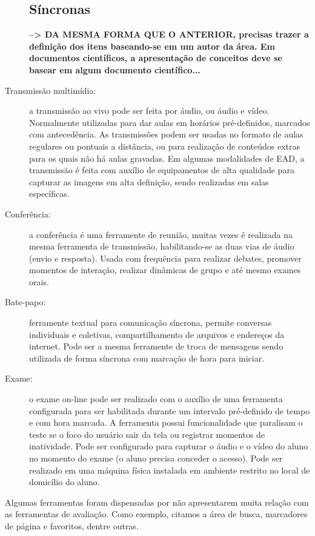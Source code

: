 \begin{description}
\subsection{Síncronas}%
\label{sub:sinc}
\textbf{--> DA MESMA FORMA QUE O ANTERIOR, precisas trazer a definição dos itens baseando-se em um autor da área. Em documentos científicos, a apresentação de conceitos deve se basear em algum documento científico...}
\item[Transmissão multimídia:] a transmissão ao vivo pode ser feita por áudio, ou áudio e vídeo. Normalmente utilizadas para dar aulas em horários pré-definidos, marcados com antecedência. As transmissões podem ser usadas no formato de aulas regulares ou pontuais a distância, ou para realização de conteúdos extras para os quais não há aulas gravadas. Em algumas modalidades de EAD, a transmissão é feita com auxílio de equipamentos de alta qualidade para capturar as imagens em alta definição, sendo realizadas em salas específicas.
\item[Conferência:] a conferência é uma ferramente de reunião, muitas vezes é realizada na mesma ferramenta de transmissão, habilitando-se as duas vias de áudio (envio e resposta). Usada com frequência para realizar debates, promover momentos de interação, realizar dinâmicas de grupo e até mesmo exames orais.
\item[Bate-papo:] ferramente textual para comunicação síncrona, permite conversas individuais e coletivas, compartilhamento de arquivos e endereços da internet. Pode ser a mesma ferramente de troca de mensagens sendo utilizada de forma síncrona com marcação de hora para iniciar.
\item[Exame:] o exame on-line pode ser realizado com o auxílio de uma ferramenta configurada para ser habilitada durante um intervalo pré-definido de tempo e com hora marcada. A ferramenta possui funcionalidade que paralisam o teste se o foco do usuário sair da tela ou registrar momentos de inatividade. Pode ser configurado para capturar o áudio e o vídeo do aluno no momento do exame (o aluno precisa conceder o acesso). Pode ser realizado em uma máquina física instalada em ambiente restrito no local de domicílio do aluno.
\end{description}

Algumas ferramentas foram dispensadas por não apresentarem muita relação com as ferramentas de avaliação. Como exemplo, citamos a área de busca, marcadores de página e favoritos, dentre outras.
